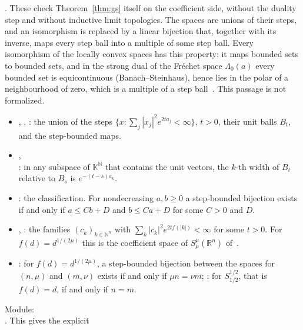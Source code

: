 \documentclass[11pt]{article}
\theoremstyle{definition}
\begin{document}
. These check
Theorem~\ref{thm:gs} itself on the coefficient side, without the duality step and without
inductive limit topologies. The spaces are unions of their steps, and an isomorphism is replaced
by a linear bijection that, together with its inverse, maps every step ball into a multiple of
some step ball. Every isomorphism of the locally convex spaces has this property: it maps
bounded sets to bounded sets, and in the strong dual of the Fr\'echet space $\Lambda_0(a)$ every
bounded set is equicontinuous (Banach--Steinhaus), hence lies in the polar of a neighbourhood of
zero, which is a multiple of a step ball~\cite{mv}. This passage is not formalized.
\begin{itemize}
  \item {}, ,
    : the union of the steps
    $\{x : \sum_j |x_j|^2e^{2ta_j} < \infty\}$, $t > 0$, their unit balls $B_t$, and the
    step-bounded maps.
  \item {},\\
    : in any subspace of
    $\mathbb K^{\mathbb N}$ that contains the unit vectors, the $k$-th width of $B_t$ relative
    to $B_s$ is $e^{-(t-s)a_k}$.
  \item {}: the classification. For
    nondecreasing $a, b \ge 0$ a step-bounded bijection exists if and only if $a \le Cb + D$
    and $b \le Ca + D$ for some $C > 0$ and $D$.
  \item {}, : the families
    $(c_k)_{k \in \mathbb N^n}$ with $\sum_k |c_k|^2 e^{2tf(|k|)} < \infty$ for some $t > 0$.
    For $f(d) = d^{1/(2\mu)}$ this is the coefficient space of $S^\mu_\mu(\mathbb R^n)$
    of~\cite{gpr}.
  \item {}: for
    $f(d) = d^{1/(2\mu)}$, a step-bounded bijection between the spaces for $(n, \mu)$ and
    $(m, \nu)$ exists if and only if $\mu n = \nu m$;
    : for $S^{1/2}_{1/2}$, that is
    $f(d) = d$, if and only if $n = m$.
\end{itemize}
Module:\\ . This gives the explicit
\end{document}
